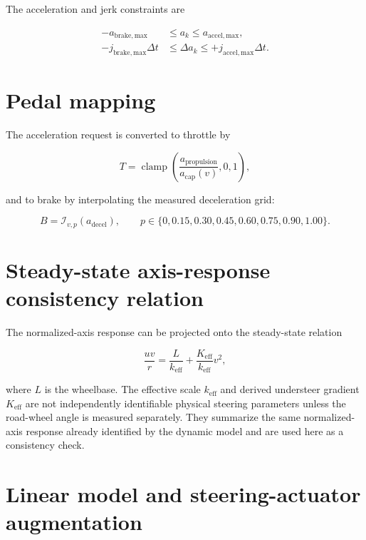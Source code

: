\documentclass[9pt]{article}
\begin{document}
The acceleration and jerk constraints are

\begin{align}
-a_{\mathrm{brake,max}}
&\leq a_k \leq a_{\mathrm{accel,max}},
\label{eq:longitudinal-accel-constraint}\\
-j_{\mathrm{brake,max}}\Delta t
&\leq \Delta a_k \leq
+j_{\mathrm{accel,max}}\Delta t.
\label{eq:longitudinal-jerk-constraint}
\end{align}

\section{Pedal mapping}

The acceleration request is converted to throttle by

\begin{equation}
T
=
\operatorname{clamp}\!\left(
\frac{a_{\mathrm{propulsion}}}
{a_{\mathrm{cap}}(v)},
0,
1
\right),
\label{eq:throttle-map}
\end{equation}

and to brake by interpolating the measured deceleration grid:

\begin{equation}
B
=
\mathcal{I}_{v,p}\!\left(a_{\mathrm{decel}}\right),
\qquad
p\in\{0,0.15,0.30,0.45,0.60,0.75,0.90,1.00\}.
\label{eq:brake-map}
\end{equation}

\section{Steady-state axis-response consistency relation}

The normalized-axis response can be projected onto the steady-state relation

\begin{equation}
\frac{u v}{r}
=
\frac{L}{k_{\mathrm{eff}}}
+ \frac{K_{\mathrm{eff}}}{k_{\mathrm{eff}}}v^2,
\label{eq:steering-calibration}
\end{equation}

where $L$ is the wheelbase. The effective scale $k_{\mathrm{eff}}$ and
derived understeer gradient $K_{\mathrm{eff}}$ are not independently
identifiable physical steering parameters unless the road-wheel angle is
measured separately. They summarize the same normalized-axis response already
identified by the dynamic model and are used here as a consistency check.

\section{Linear model and steering-actuator augmentation}
\end{document}
